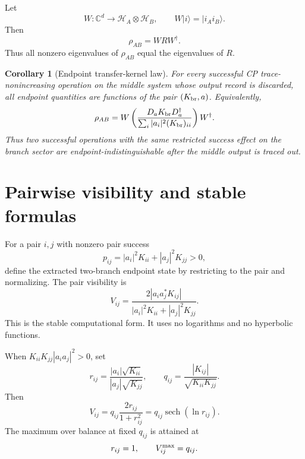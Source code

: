 \documentclass[reprint,aps,pra,superscriptaddress,nofootinbib,longbibliography]{revtex4-2}
\newtheorem{corollary}[theorem]{Corollary}
\newcommand{\ket}[1]{|#1\rangle}
\newcommand{\HH}{\mathcal H}
\newcommand{\sech}{\operatorname{sech}}
\begin{document}
Let
\begin{equation}
W:\mathbb C^d\to \HH_A\otimes\HH_B,
\qquad
W\ket{i}=\ket{i_Ai_B}.
\label{eq:isometry}
\end{equation}
Then
\begin{equation}
\rho_{AB}=WRW^\dagger.
\label{eq:isometric-embedding}
\end{equation}
Thus all nonzero eigenvalues of \(\rho_{AB}\) equal the eigenvalues of \(R\).

\begin{corollary}[Endpoint transfer-kernel law]
For every successful CP trace-nonincreasing operation on the middle system whose output record is discarded, all endpoint quantities are functions of the pair \((K_{\rm br},a)\).  Equivalently,
\[
\rho_{AB}
=
W\left(
\frac{D_aK_{\rm br}D_a^\dagger}
{\sum_i |a_i|^2(K_{\rm br})_{ii}}
\right)W^\dagger .
\]
Thus two successful operations with the same restricted success effect on the branch sector are endpoint-indistinguishable after the middle output is traced out.
\end{corollary}

\section{Pairwise visibility and stable formulas}
\label{sec:pairwise}

For a pair \(i,j\) with nonzero pair success
\begin{equation}
p_{ij}
=
|a_i|^2K_{ii}+|a_j|^2K_{jj}>0,
\label{eq:pij}
\end{equation}
define the extracted two-branch endpoint state by restricting to the pair and normalizing.  The pair visibility is
\begin{equation}
V_{ij}
=
\frac{2|a_i a_j^*K_{ij}|}{|a_i|^2K_{ii}+|a_j|^2K_{jj}}.
\label{eq:Vij-stable}
\end{equation}
This is the stable computational form.  It uses no logarithms and no hyperbolic functions.

When \(K_{ii}K_{jj}|a_i a_j|^2>0\), set
\begin{equation}
r_{ij}
=
\frac{|a_i|\sqrt{K_{ii}}}{|a_j|\sqrt{K_{jj}}},
\qquad
q_{ij}
=
\frac{|K_{ij}|}{\sqrt{K_{ii}K_{jj}}}.
\label{eq:rij-qij}
\end{equation}
Then
\begin{equation}
V_{ij}
=
q_{ij}\frac{2r_{ij}}{1+r_{ij}^2}
=
q_{ij}\sech(\ln r_{ij}).
\label{eq:pair-law}
\end{equation}
The maximum over balance at fixed \(q_{ij}\) is attained at
\begin{equation}
r_{ij}=1,
\qquad
V_{ij}^{\rm max}=q_{ij}.
\end{equation}
\end{document}
